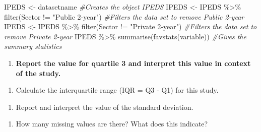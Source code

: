 \documentclass[
]{report}
\newenvironment{Shaded}{\begin{snugshade}}{\end{snugshade}}
\newcommand{\CommentTok}[1]{\textcolor[rgb]{0.56,0.35,0.01}{\textit{#1}}}
\newcommand{\FunctionTok}[1]{\textcolor[rgb]{0.00,0.00,0.00}{#1}}
\newcommand{\NormalTok}[1]{#1}
\newcommand{\OtherTok}[1]{\textcolor[rgb]{0.56,0.35,0.01}{#1}}
\newcommand{\SpecialCharTok}[1]{\textcolor[rgb]{0.00,0.00,0.00}{#1}}
\newcommand{\StringTok}[1]{\textcolor[rgb]{0.31,0.60,0.02}{#1}}
\providecommand{\tightlist}{%
  \setlength{\itemsep}{0pt}\setlength{\parskip}{0pt}}
\begin{document}
\begin{Shaded}
\begin{Highlighting}[]
\NormalTok{IPEDS }\OtherTok{\textless{}{-}}\NormalTok{ datasetname }\CommentTok{\#Creates the object IPEDS }
\NormalTok{IPEDS }\OtherTok{\textless{}{-}}\NormalTok{ IPEDS }\SpecialCharTok{\%\textgreater{}\%}
  \FunctionTok{filter}\NormalTok{(Sector }\SpecialCharTok{!=} \StringTok{"Public 2{-}year"}\NormalTok{) }\CommentTok{\#Filters the data set to remove Public 2{-}year}
\NormalTok{IPEDS }\OtherTok{\textless{}{-}}\NormalTok{ IPEDS }\SpecialCharTok{\%\textgreater{}\%}
  \FunctionTok{filter}\NormalTok{(Sector }\SpecialCharTok{!=} \StringTok{"Private 2{-}year"}\NormalTok{) }\CommentTok{\#Filters the data set to remove Private 2{-}year}
\NormalTok{IPEDS }\SpecialCharTok{\%\textgreater{}\%}
  \FunctionTok{summarise}\NormalTok{(}\FunctionTok{favstats}\NormalTok{(variable)) }\CommentTok{\#Gives the summary statistics}
\end{Highlighting}
\end{Shaded}

\begin{enumerate}
\def\labelenumi{\arabic{enumi}.}
\setcounter{enumi}{1}
\tightlist
\item
  \textbf{Report the value for quartile 3 and interpret this value in context of the study.}
\end{enumerate}

\vspace{1in}

\begin{enumerate}
\def\labelenumi{\arabic{enumi}.}
\setcounter{enumi}{2}
\tightlist
\item
  Calculate the interquartile range (IQR = Q3 - Q1) for this study.
\end{enumerate}

\vspace{0.5in}

\begin{enumerate}
\def\labelenumi{\arabic{enumi}.}
\setcounter{enumi}{3}
\tightlist
\item
  Report and interpret the value of the standard deviation.
\end{enumerate}

\vspace{1in}

\begin{enumerate}
\def\labelenumi{\arabic{enumi}.}
\setcounter{enumi}{4}
\tightlist
\item
  How many missing values are there? What does this indicate?
\end{enumerate}
\end{document}
